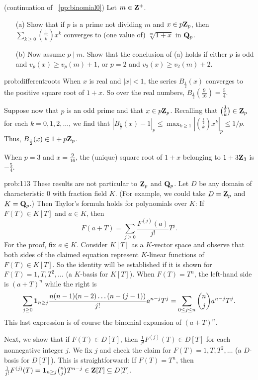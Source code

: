 \begin{challenge}(continuation of \pp~\ref{pp:binomial0})\label{pp:binomial1} Let $m\in \mathbf{Z}^{+}$.
\begin{enumerate}
\vspace{-0.12in}
\item[(a)] Show that if $p$ is a prime not dividing $m$ and $x \in p\mathbf{Z}_p$, then $\sum_{k\ge 0} \binom{\frac{1}{m}}{k} x^k$ converges to (one value of) $\sqrt[m]{1+x}$ in $\mathbf{Q}_p$.
\item[(b)] Now assume $p\mid m$. Show that the conclusion of (a) holds if either $p$ is odd and $v_p(x) \ge v_p(m)+1$, or $p=2$ and $v_2(x) \ge v_2(m)+2$.
\end{enumerate}

\end{challenge}

\begin{sol}{prob:differentroots} When $x$ is real and $|x| < 1$, the series $B_{\frac12}(x)$ converges to the positive square root of $1+x$. So over the real numbers, $B_{\frac12}(\frac{9}{16}) = \frac{5}{4}$.

Suppose now that $p$ is an odd prime and that $x \in p\mathbf{Z}_p$. Recalling that $\binom{\frac{1}{2}}{k} \in \mathbf{Z}_p$ for each $k=0,1,2,\dots$, we find that
$|B_{\frac{1}{2}}(x) - 1|_p \le \max_{k\ge 1} |\binom{\frac{1}{2}}{k} x^k|_p \le 1/p$. Thus, $B_{\frac12}(x) \in 1 + p\mathbf{Z}_{p}$. 

When $p=3$ and $x=\frac{9}{16}$, the (unique) square root of $1+x$ belonging to $1+3\mathbf{Z}_3$ is $-\frac{5}{4}$.
\end{sol}



\begin{sol}{prob:113} These results are not particular to $\mathbf{Z}_p$ and $\mathbf{Q}_p$. Let $D$ be any domain of characteristic $0$ with fraction field $K$. (For example, we could take $D=\mathbf{Z}_p$ and $K=\mathbf{Q}_p$.) Then Taylor's formula holds for polynomials over $K$: If $F(T) \in K[T]$ and $a \in K$, then
\[ F(a+T) = \sum_{j \ge 0} \frac{F^{(j)}{(a)}}{j!} T^j.\]
For the proof, fix $a\in K$. Consider $K[T]$ as a $K$-vector space and observe that both  sides of the claimed equation represent $K$-linear functions of $F(T) \in K[T]$. So the identity will be established if it is shown for $F(T) = 1, T, T^2, \dots$ (a $K$-basis for $K[T]$). When $F(T) = T^n$,  the left-hand side is $(a+T)^n$ while the right is
\[ \sum_{j\ge 0} \mathbf{1}_{n\ge j} \frac{n(n-1)(n-2)\dots(n-(j-1))}{j!} a^{n-j} T^j = \sum_{0\le j \le n} \binom{n}{j} a^{n-j} T^j. \]
This last expression is of course the binomial expansion of $(a+T)^n$. 

Next, we show that if $F(T) \in D[T]$, then $\frac{1}{j!} F^{(j)}(T) \in D[T]$ for each nonnegative integer $j$. We fix $j$ and check the claim for $F(T) = 1, T, T^2, \dots$ (a $D$-basis for $D[T]$). This is straightforward: If $F(T) = T^n$, then $\frac{1}{j!} F^{(j)}(T) = \mathbf{1}_{n\ge j} \binom{n}{j} T^{n-j} \in \mathbf{Z}[T] \subseteq D[T]$.
\end{sol}



